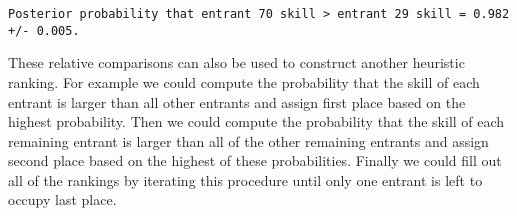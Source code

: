 \documentclass[
  letterpaper,
  DIV=11,
  numbers=noendperiod]{scrartcl}
\newenvironment{Shaded}{\begin{snugshade}}{\end{snugshade}}
\newcommand{\ControlFlowTok}[1]{\textcolor[rgb]{0.00,0.23,0.31}{#1}}
\newcommand{\DecValTok}[1]{\textcolor[rgb]{0.68,0.00,0.00}{#1}}
\newcommand{\FunctionTok}[1]{\textcolor[rgb]{0.28,0.35,0.67}{#1}}
\newcommand{\NormalTok}[1]{\textcolor[rgb]{0.00,0.23,0.31}{#1}}
\newcommand{\OtherTok}[1]{\textcolor[rgb]{0.00,0.23,0.31}{#1}}
\newcommand{\SpecialCharTok}[1]{\textcolor[rgb]{0.37,0.37,0.37}{#1}}
\newcommand{\StringTok}[1]{\textcolor[rgb]{0.13,0.47,0.30}{#1}}
\begin{document}
\begin{Shaded}
\end{Shaded}

\begin{verbatim}
Posterior probability that entrant 70 skill > entrant 29 skill = 0.982 +/- 0.005.
\end{verbatim}

These relative comparisons can also be used to construct another
heuristic ranking. For example we could compute the probability that the
skill of each entrant is larger than all other entrants and assign first
place based on the highest probability. Then we could compute the
probability that the skill of each remaining entrant is larger than all
of the other remaining entrants and assign second place based on the
highest of these probabilities. Finally we could fill out all of the
rankings by iterating this procedure until only one entrant is left to
occupy last place.
\end{document}
